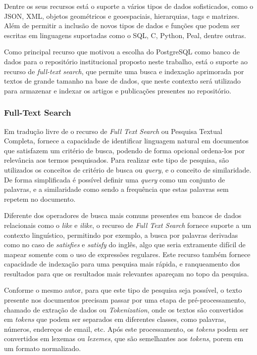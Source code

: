 Dentre os seus recursos está o suporte a vários tipos de dados sofisticados,
como o JSON, XML, objetos geométricos e geoespaciais, hierarquias, tags e matrizes.
Além de permitir a inclusão de novos tipos de dados e funções que podem ser
escritas em linguagens suportadas como o SQL, C, Python, Peal, dentre outras.

Como principal recurso que motivou a escolha do PostgreSQL como banco de dados
para o repositório institucional proposto neste trabalho, está o suporte ao
recurso de \emph{full-text search}, que permite uma busca e indexação aprimorada
por textos de grande tamanho na base de dados, que neste contexto será
utilizado para armazenar e indexar os artigos e publicações presentes no repositório.

\subsubsection{Full-Text Search}

Em tradução livre de \cite{2022:PostgreSQL}
o recurso de \emph{Full Text Search} ou Pesquisa Textual Completa,
fornece a capacidade de identificar linguagem natural em documentos
que satisfazem um critério de busca, podendo de forma opcional ordena-los
por relevância aos termos pesquisados. Para realizar este tipo de pesquisa,
são utilizados os conceitos de critério de busca ou \emph{query}, e o
conceito de similaridade. De forma simplificada é possível definir uma
\emph{query} como um conjunto de palavras, e a similaridade como sendo a
frequência que estas palavras sem repetem no documento.

Diferente dos operadores de busca mais comuns presentes em bancos de dados
relacionais como o \emph{like} e \emph{ilike}, o recurso de \emph{Full Text Search}
fornece suporte a um contexto linguístico, permitindo por exemplo, a busca por palavras
derivadas como no caso de \emph{satisfies} e \emph{satisfy} do inglês, algo que
seria extramente difícil de mapear somente com o uso de expressões regulares. Este recurso
também fornece capacidade de indexação para uma pesquisa mais rápida, e ranqueamento
dos resultados para que os resultados mais relevantes apareçam no topo da pesquisa.

Conforme o mesmo autor, para que este tipo de pesquisa seja possível, o texto presente nos documentos precisam
passar por uma etapa de pré-processamento, chamado de extração de dados ou \emph{Tokenization},
onde os textos são convertidos em \emph{tokens} que podem ser separados em diferentes classes,
como palavras, números, endereços de email, etc. Após este processamento, os \emph{tokens}
podem ser convertidos em lexemas ou \emph{lexemes}, que são semelhantes aos \emph{tokens},
porem em um formato normalizado.

